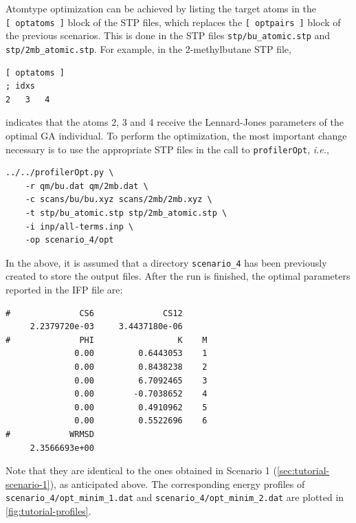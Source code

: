 \documentclass[10pt,a4paper]{report}
\numberwithin{equation}{section}
\newcommand{\under}{\_}
\newcommand{\profileropt}[0]{\texttt{profilerOpt}}
\begin{document}
Atomtype optimization can be achieved by listing the target atoms in
the \texttt{[~optatoms~]} block of the STP files, which replaces the
\texttt{[~optpairs~]} block of the previous scenarios.
%
This is done in the STP files \texttt{stp/bu\under{}atomic.stp} and
\texttt{stp/2mb\under{}atomic.stp}.
%
For example, in the 2-methylbutane STP file,

\begin{lstlisting}[language=gromacs]
[ optatoms ]
; idxs
2   3   4
\end{lstlisting}\vspace{-2ex}\par

\noindent indicates that the atoms 2, 3 and 4 receive the
Lennard-Jones parameters of the optimal GA individual.
%
To perform the optimization, the most important change necessary is to
use the appropriate STP files in the call to \profileropt,
\textit{i.e.},

\begin{lstlisting}
../../profilerOpt.py \
    -r qm/bu.dat qm/2mb.dat \
    -c scans/bu/bu.xyz scans/2mb/2mb.xyz \
    -t stp/bu_atomic.stp stp/2mb_atomic.stp \
    -i inp/all-terms.inp \
    -op scenario_4/opt
\end{lstlisting}\vspace{-2ex}\par

\noindent In the above, it is assumed that a directory
\texttt{scenario\under{}4} has been previously created to store the
output files.
%
After the run is finished, the optimal parameters reported in the IFP
file are:

\begin{lstlisting}
#              CS6              CS12
     2.2379720e-03     3.4437180e-06
#              PHI                 K    M
              0.00         0.6443053    1
              0.00         0.8438238    2
              0.00         6.7092465    3
              0.00        -0.7038652    4
              0.00         0.4910962    5
              0.00         0.5522696    6
#            WRMSD
     2.3566693e+00
\end{lstlisting}\vspace{-2ex}\par

\noindent Note that they are identical to the ones obtained in
Scenario 1 (\autoref{sec:tutorial-scenario-1}), as anticipated above.
%
The corresponding energy profiles of
\texttt{scenario\under{}4/opt\under{}minim\under{}1.dat} and
\texttt{scenario\under{}4/opt\under{}minim\under{}2.dat} are plotted
in \autoref{fig:tutorial-profiles}.
\end{document}
